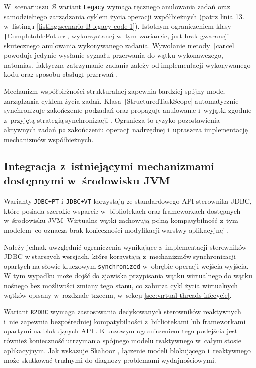 W~scenariuszu $\mathcal{B}$ wariant \texttt{Legacy} wymaga ręcznego anulowania zadań oraz samodzielnego zarządzania cyklem życia operacji współbieżnych (patrz linia 13. w~listingu \ref{listing:scenario-B-legacy-code-1}). Istotnym ograniczeniem klasy \texttt|CompletableFuture|, wykorzystanej w~tym wariancie, jest brak gwarancji skutecznego anulowania wykonywanego zadania. Wywołanie metody \texttt|cancel| powoduje jedynie wysłanie sygnału przerwania do wątku wykonawczego, natomiast faktyczne zatrzymanie zadania zależy od implementacji wykonywanego kodu oraz sposobu obsługi przerwań \cite{java-completable-future,goetz2006}.

Mechanizm współbieżności strukturalnej zapewnia bardziej spójny model zarządzania cyklem życia zadań. Klasa \texttt|StructuredTaskScope| automatycznie synchronizuje zakończenie podzadań oraz propaguje anulowanie i~wyjątki zgodnie z~przyjętą strategią synchronizacji \cite{jep525}. Ogranicza to ryzyko pozostawienia aktywnych zadań po zakończeniu operacji nadrzędnej i~upraszcza implementację mechanizmów współbieżnych.

\subsection{Integracja z~istniejącymi mechanizmami dostępnymi w~środowisku JVM}

Warianty \texttt{JDBC+PT} i~\texttt{JDBC+VT} korzystają ze standardowego API sterownika JDBC, które posiada szerokie wsparcie w~bibliotekach oraz frameworkach dostępnych w~środowisku JVM. Wirtualne wątki zachowują pełną kompatybilność z~tym modelem, co oznacza brak konieczności modyfikacji warstwy aplikacyjnej \cite{jep444}.

Należy jednak uwzględnić ograniczenia wynikające z~implementacji sterowników JDBC w starszych wersjach, które korzystają z~mechanizmów synchronizacji opartych na słowie kluczowym \texttt{synchronized} w~obrębie operacji wejścia-wyjścia. W tym wypadku może dojść do zjawiska przypisania wątku wirtualnego do wątku nośnego bez możliwości zmiany tego stanu, co zaburza cykl życia wirtualnych wątków opisany w~rozdziale trzecim, w~sekcji \ref{sec:virtual-threads-lifecycle}.

Wariant \texttt{R2DBC} wymaga zastosowania dedykowanych sterowników reaktywnych i~nie zapewnia bezpośredniej kompatybilności z~bibliotekami lub frameworkami opartymi na blokujących API \cite{r2dbc-documentation}. Kluczowym ograniczeniem tego podejścia jest również konieczność utrzymania spójnego modelu reaktywnego w~całym stosie aplikacyjnym. Jak wskazuje Shahoor \cite{shahoor2024}, łączenie modeli blokującego i~reaktywnego może skutkować trudnymi do diagnozy problemami wydajnościowymi.

